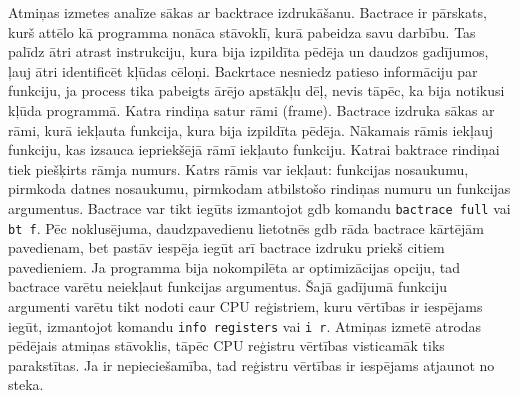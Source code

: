 Atmiņas izmetes analīze sākas ar backtrace izdrukāšanu. 
Bactrace ir pārskats, kurš attēlo kā programma nonāca stāvoklī, kurā pabeidza savu darbību.
Tas palīdz ātri atrast instrukciju, kura bija izpildīta pēdēja un daudzos gadījumos, ļauj ātri identificēt kļūdas cēloņi.
Backrtace nesniedz patieso informāciju par funkciju, ja process tika pabeigts ārējo apstākļu dēļ, nevis tāpēc, ka bija notikusi kļūda programmā.
Katra rindiņa satur rāmi (frame). Bactrace izdruka sākas ar rāmi, kurā iekļauta funkcija, kura bija izpildīta pēdēja. 
Nākamais rāmis iekļauj funkciju, kas izsauca iepriekšējā rāmī iekļauto funkciju.
Katrai baktrace rindiņai tiek piešķirts rāmja numurs. Katrs rāmis var iekļaut: funkcijas nosaukumu, pirmkoda datnes nosaukumu, pirmkodam atbilstošo rindiņas numuru un funkcijas argumentus. 
Bactrace var tikt iegūts izmantojot gdb komandu \texttt{bactrace full} vai \texttt{bt f}. 
Pēc noklusējuma, daudzpavedienu lietotnēs gdb  rāda bactrace kārtējām pavedienam, bet pastāv iespēja iegūt arī bactrace izdruku priekš citiem pavedieniem.
Ja programma bija nokompilēta ar optimizācijas opciju, tad bactrace varētu neiekļaut funkcijas argumentus.
Šajā gadījumā funkciju argumenti varētu tikt nodoti caur CPU reģistriem, kuru vērtības ir iespējams iegūt, izmantojot komandu \texttt{info registers} vai \texttt{i r}.
Atmiņas izmetē atrodas pēdējais atmiņas stāvoklis, tāpēc CPU reģistru vērtības visticamāk tiks parakstītas.
 Ja ir nepieciešamība, tad reģistru vērtības ir iespējams atjaunot no steka.

